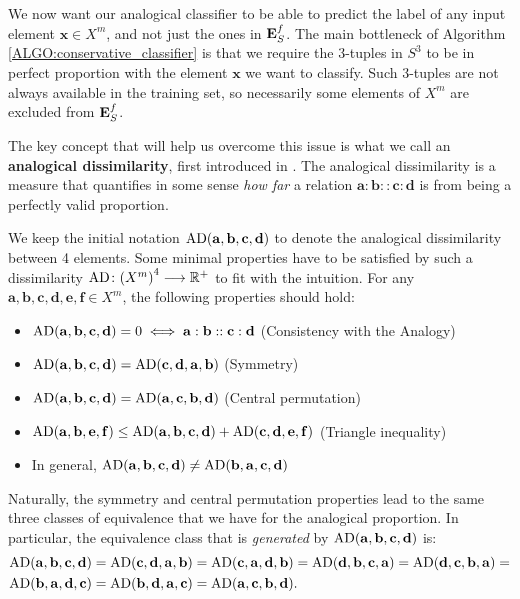 We now want our analogical classifier to be able to predict the label of any
input element $\mathbf{x} \in X^m$, and not just the ones in $\mathbf{E}_{S}^{f}$.
The main bottleneck of Algorithm \ref{ALGO:conservative_classifier} is that we
require the 3-tuples in $S^3$ to be in perfect proportion with the element
$\mathbf{x}$ we want to classify. Such 3-tuples are not always available in the
training set, so necessarily some elements of $X^m$ are excluded from $\mathbf{E}_{S}^{f}$.

The key concept that will help us overcome this issue is what we call an
\textbf{analogical dissimilarity}, first introduced in
\cite{BayMicDelIJCAI07}. The analogical dissimilarity is a measure that
quantifies in some sense \textit{how far} a relation $\mathbf{a} : \mathbf{b}
:: \mathbf{c} : \mathbf{d}$ is from being a perfectly valid proportion.

We keep the initial notation $\text{AD}(\mathbf{a}, \mathbf{b},
\mathbf{c},\mathbf{d})$ to denote the analogical dissimilarity between 4
elements.  Some  minimal properties have to be satisfied by such a
dissimilarity $\text{AD} \colon {(X^m)}^4 \longrightarrow \mathbb{R}^+$ to fit
with the intuition. For any $\mathbf{a}, \mathbf{b},\mathbf{c},\mathbf{d},
\mathbf{e}, \mathbf{f} \in X^m$, the following properties should hold:
\begin{itemize}
  \item $\text{AD}(\mathbf{a}, \mathbf{b},\mathbf{c},\mathbf{d})=0 \iff \mathbf{a} :
    \mathbf{b}:: \mathbf{c} : \mathbf{d}$ (Consistency with the Analogy)
  \item $\text{AD}(\mathbf{a}, \mathbf{b},\mathbf{c},\mathbf{d})=
    \text{AD}(\mathbf{c}, \mathbf{d},\mathbf{a},\mathbf{b})$ (Symmetry)
  \item $\text{AD}(\mathbf{a}, \mathbf{b},\mathbf{c},\mathbf{d})=
    \text{AD}(\mathbf{a}, \mathbf{c},\mathbf{b},\mathbf{d})$ (Central permutation)
  \item $\text{AD}(\mathbf{a}, \mathbf{b},\mathbf{e},\mathbf{f}) \leq \text{AD}(\mathbf{a},
    \mathbf{b},\mathbf{c},\mathbf{d}) + \text{AD}(\mathbf{c},
    \mathbf{d},\mathbf{e},\mathbf{f})$ (Triangle inequality)
  \item In general, $\text{AD}(\mathbf{a}, \mathbf{b},\mathbf{c},\mathbf{d}) \neq
    \text{AD}(\mathbf{b}, \mathbf{a},\mathbf{c},\mathbf{d})$
\end{itemize}
Naturally, the symmetry and central permutation properties lead to the same
three classes of equivalence that we have for the analogical proportion. In
particular, the equivalence class that is \textit{generated} by
$\text{AD}(\mathbf{a}, \mathbf{b},\mathbf{c},\mathbf{d})$ is:
\begin{align*}
  &\text{AD}(\mathbf{a}, \mathbf{b},\mathbf{c},\mathbf{d}) =
\text{AD}(\mathbf{c}, \mathbf{d},\mathbf{a},\mathbf{b})=
\text{AD}(\mathbf{c}, \mathbf{a},\mathbf{d},\mathbf{b})=
\text{AD}(\mathbf{d}, \mathbf{b},\mathbf{c},\mathbf{a})=
\text{AD}(\mathbf{d}, \mathbf{c},\mathbf{b},\mathbf{a})=\\
  &\text{AD}(\mathbf{b}, \mathbf{a},\mathbf{d},\mathbf{c})=
\text{AD}(\mathbf{b}, \mathbf{d},\mathbf{a},\mathbf{c})=
\text{AD}(\mathbf{a}, \mathbf{c},\mathbf{b},\mathbf{d}).
\end{align*}

